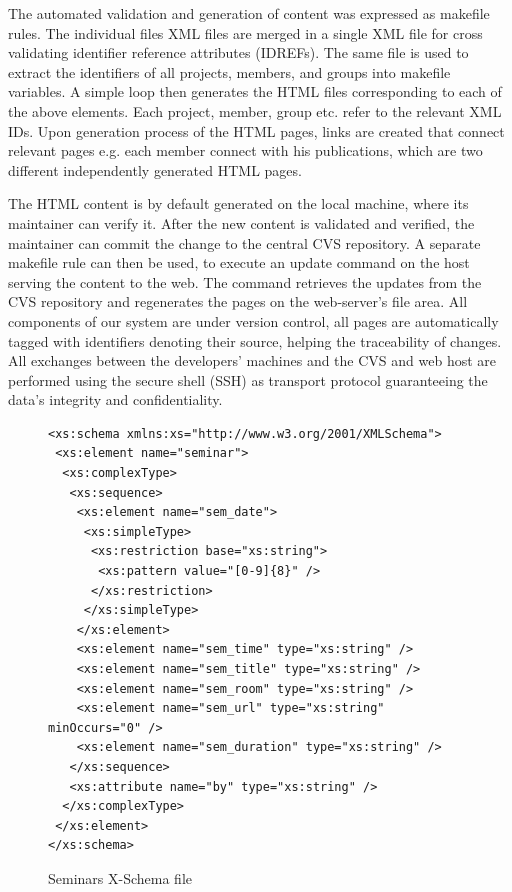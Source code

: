 \documentclass[10pt]{article}
\begin{document}
The automated validation and generation of content was
expressed as makefile rules.
The individual files {\sc XML} files are merged in a
single {\sc XML} file for cross validating identifier
reference attributes ({\sc IDREFs}).
The same file is used to extract the identifiers of
all projects, members, and groups into makefile
variables.
A simple loop then generates the {\sc HTML} files
corresponding to each of the above elements.
Each project, member, group etc. refer to the relevant {\sc XML IDs}.
Upon generation process of the {\sc HTML} pages, links are created that
connect relevant pages e.g. each member connect with his publications, 
which are two different independently generated {\sc HTML} pages.

The {\sc HTML} content is by default generated on the
local machine, where its maintainer can verify it.
After the new content is validated and verified,
the maintainer can commit the change to the central {\sc CVS} repository. 
A separate makefile rule can then be used,
to execute an update command on the
host serving the content to the web.
The command retrieves the updates from the {\sc CVS}
repository and regenerates the pages on the web-server's
file area.
All components of our system are under version control,
all pages are automatically tagged with identifiers
denoting their source, helping the traceability of changes.
All exchanges between the developers' machines and the
{\sc CVS} and web host are performed using the secure
shell ({\sc SSH}) as transport protocol guaranteeing the data's integrity
and confidentiality.

\begin{figure}
\lstset{language=MYLANG,basicstyle=\ttfamily}
{\begin{lstlisting}
<xs:schema xmlns:xs="http://www.w3.org/2001/XMLSchema">
 <xs:element name="seminar">
  <xs:complexType>
   <xs:sequence>
    <xs:element name="sem_date">
     <xs:simpleType>
      <xs:restriction base="xs:string">
       <xs:pattern value="[0-9]{8}" />
      </xs:restriction>
     </xs:simpleType>
    </xs:element>
    <xs:element name="sem_time" type="xs:string" />
    <xs:element name="sem_title" type="xs:string" />
    <xs:element name="sem_room" type="xs:string" />
    <xs:element name="sem_url" type="xs:string" minOccurs="0" />
    <xs:element name="sem_duration" type="xs:string" />
   </xs:sequence>
   <xs:attribute name="by" type="xs:string" />
  </xs:complexType>
 </xs:element>
</xs:schema>
\end{lstlisting}}
\caption{Seminars X-Schema file}
\label{fig:project-dtd}
\end{figure}
\end{document}
